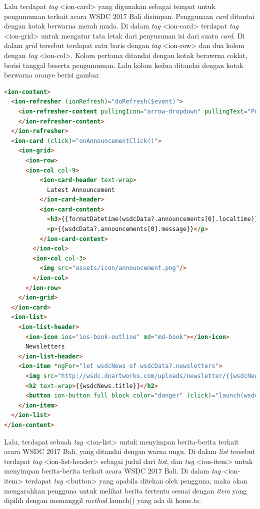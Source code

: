\begin{itemize}
\begin{itemize}
		Lalu terdapat \textit{tag} <ion-card> yang digunakan sebagai tempat untuk pengumuman terkait acara WSDC 2017 Bali disimpan. Penggunaan \textit{card} ditantai dengan kotak berwarna merah muda. Di dalam \textit{tag} <ion-card> terdapat \textit{tag} <ion-grid> untuk mengatur tata letak dari penyusunan isi dari suatu \textit{card}. Di dalam \textit{grid} tersebut terdapat satu baris dengan \textit{tag} <ion-row> dan dua kolom dengan \textit{tag} <ion-col>. Kolom pertama ditandai dengan kotak berawrna coklat, berisi tanggal beserta pengumuman. Lalu kolom kedua ditandai dengan kotak berwarna oranye berisi gambar.
		
\begin{lstlisting}[language=html, label={lst:contentHome}, caption=\textit{Content} pada home.html]
<ion-content>
  <ion-refresher (ionRefresh)="doRefresh($event)">
    <ion-refresher-content pullingIcon="arrow-dropdown" pullingText="Pull to refresh" refreshingSpinner="circles" refreshingText="Refreshing...">
    </ion-refresher-content>
  </ion-refresher>
  <ion-card (click)="onAnnouncementClick()">
    <ion-grid>
      <ion-row>
      <ion-col col-9>
          <ion-card-header text-wrap>
            Latest Announcement
          </ion-card-header>
          <ion-card-content>
            <h3>{{formatDatetime(wsdcData?.announcements[0].localtime)}}</h3>
            <p>{{wsdcData?.announcements[0].message}}</p>
          </ion-card-content>
        </ion-col>
        <ion-col col-3>
          <img src="assets/icon/announcement.png"/>
        </ion-col>
      </ion-row>
    </ion-grid>
  </ion-card>
  <ion-list>
    <ion-list-header>
      <ion-icon ios="ios-book-outline" md="md-book"></ion-icon>
      Newsletters
    </ion-list-header>
    <ion-item *ngFor="let wsdcNews of wsdcData?.newsletters">
      <img src="http://wsdc.dnartworks.com/uploads/newsletter/{{wsdcNews.id}}/thumbnail.jpg" alt="{{wsdcNews.title}}">
      <h2 text-wrap>{{wsdcNews.title}}</h2>
      <button ion-button full block color="danger" (click)="launch(wsdcNews.url)">Read More</button>
    </ion-item>
  </ion-list>
</ion-content>
\end{lstlisting}
		
		Lalu, terdapat sebuah \textit{tag} <ion-list> untuk menyimpan berita-berita terkait acara WSDC 2017 Bali, yang ditandai dengan warna ungu. Di dalam \textit{list} tersebut terdapat \textit{tag} <ion-list-header> sebagai judul dari \textit{list}, dan \textit{tag} <ion-item> untuk menyimpan berita-berita terkait acara WSDC 2017 Bali. Di dalam \textit{tag} <ion-item> terdapat \textit{tag} <button> yang apabila ditekan oleh pengguna, maka akan mengarahkan pengguna untuk melihat berita tertentu sesuai dengan \textit{item} yang dipilih dengan memanggil \textit{method} launch() yang ada di home.ts. 
	\end{itemize}


\end{itemize}
